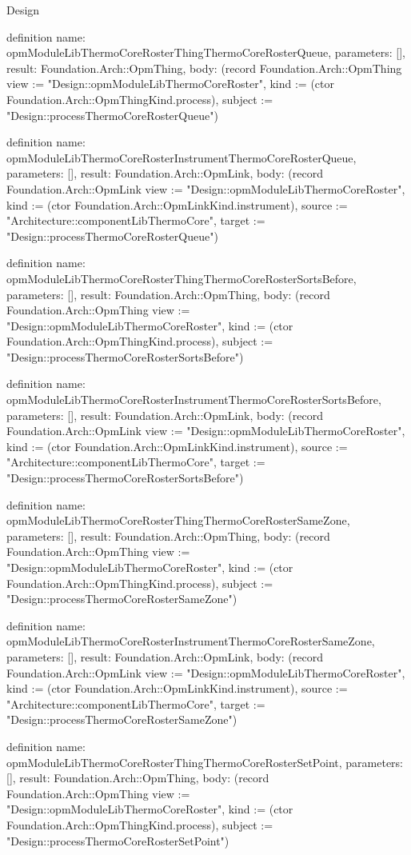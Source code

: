 \begin{lexlean}{Design}
\begin{semanticmodule}
definition{
  name: opmModuleLibThermoCoreRosterThingThermoCoreRosterQueue,
  parameters: [],
  result: Foundation.Arch::OpmThing,
  body: (record Foundation.Arch::OpmThing {view := "Design::opmModuleLibThermoCoreRoster", kind := (ctor Foundation.Arch::OpmThingKind.process), subject := "Design::processThermoCoreRosterQueue"})
}

definition{
  name: opmModuleLibThermoCoreRosterInstrumentThermoCoreRosterQueue,
  parameters: [],
  result: Foundation.Arch::OpmLink,
  body: (record Foundation.Arch::OpmLink {view := "Design::opmModuleLibThermoCoreRoster", kind := (ctor Foundation.Arch::OpmLinkKind.instrument), source := "Architecture::componentLibThermoCore", target := "Design::processThermoCoreRosterQueue"})
}

definition{
  name: opmModuleLibThermoCoreRosterThingThermoCoreRosterSortsBefore,
  parameters: [],
  result: Foundation.Arch::OpmThing,
  body: (record Foundation.Arch::OpmThing {view := "Design::opmModuleLibThermoCoreRoster", kind := (ctor Foundation.Arch::OpmThingKind.process), subject := "Design::processThermoCoreRosterSortsBefore"})
}

definition{
  name: opmModuleLibThermoCoreRosterInstrumentThermoCoreRosterSortsBefore,
  parameters: [],
  result: Foundation.Arch::OpmLink,
  body: (record Foundation.Arch::OpmLink {view := "Design::opmModuleLibThermoCoreRoster", kind := (ctor Foundation.Arch::OpmLinkKind.instrument), source := "Architecture::componentLibThermoCore", target := "Design::processThermoCoreRosterSortsBefore"})
}

definition{
  name: opmModuleLibThermoCoreRosterThingThermoCoreRosterSameZone,
  parameters: [],
  result: Foundation.Arch::OpmThing,
  body: (record Foundation.Arch::OpmThing {view := "Design::opmModuleLibThermoCoreRoster", kind := (ctor Foundation.Arch::OpmThingKind.process), subject := "Design::processThermoCoreRosterSameZone"})
}

definition{
  name: opmModuleLibThermoCoreRosterInstrumentThermoCoreRosterSameZone,
  parameters: [],
  result: Foundation.Arch::OpmLink,
  body: (record Foundation.Arch::OpmLink {view := "Design::opmModuleLibThermoCoreRoster", kind := (ctor Foundation.Arch::OpmLinkKind.instrument), source := "Architecture::componentLibThermoCore", target := "Design::processThermoCoreRosterSameZone"})
}

definition{
  name: opmModuleLibThermoCoreRosterThingThermoCoreRosterSetPoint,
  parameters: [],
  result: Foundation.Arch::OpmThing,
  body: (record Foundation.Arch::OpmThing {view := "Design::opmModuleLibThermoCoreRoster", kind := (ctor Foundation.Arch::OpmThingKind.process), subject := "Design::processThermoCoreRosterSetPoint"})
}


\end{semanticmodule}
\end{lexlean}
